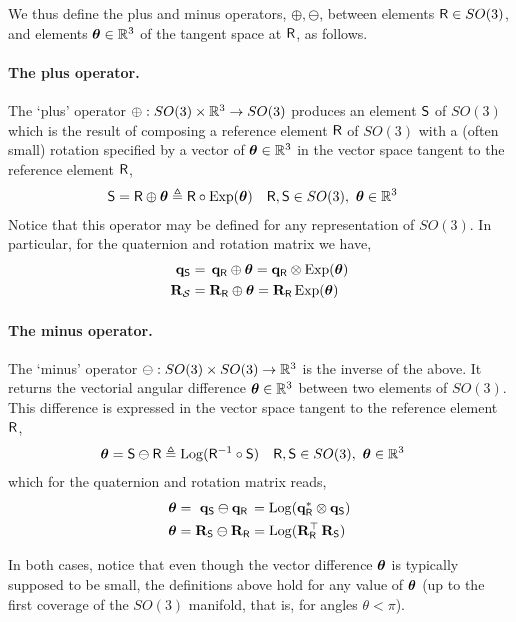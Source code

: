 We thus define the plus and minus operators, $\oplus,\ominus$, between elements $\mathsf R\in SO(3)$, and elements ${{\bm \theta}}\in{\mathbb R}^3$ of the tangent space at $\mathsf R$, as follows.

\paragraph{The plus operator.}
The `plus' operator $\oplus:SO(3)\times{\mathbb R}^3\to SO(3)$ produces an element $\mathsf S$ of $SO(3)$ which is the result of composing a reference element $\mathsf R$ of $SO(3)$ with a (often small) rotation specified by a vector of ${{\bm \theta}}\in{\mathbb R}^3$ in the vector space tangent to the reference element $\mathsf R$,
%
\begin{align}
\mathsf S = \mathsf R\oplus {{\bm \theta}} &\triangleq \mathsf R\circ\operatorname*{Exp}({{\bm \theta}}) && \mathsf R,\mathsf S\in SO(3),~ {{\bm \theta}}\in{\mathbb R}^3 
\end{align}
%
Notice that this operator may be defined for any representation of $SO(3)$. In particular, for the quaternion and rotation matrix we have,
%
\begin{align}
{\bf q}_\mathsf S &= \,{\bf q}_\mathsf R\oplus{{\bm \theta}} = {\bf q}_\mathsf R\otimes\operatorname*{Exp}({{\bm \theta}}) \\
{\bf R}_{\mathcal{S}} &= {\bf R}_\mathsf R\oplus {{\bm \theta}} = {\bf R}_\mathsf R\operatorname*{Exp}({{\bm \theta}}) 
\end{align}

\paragraph{The minus operator.}
The `minus' operator $\ominus:SO(3)\times SO(3)\to{\mathbb R}^3$ is the inverse of the above. It returns the vectorial angular difference ${{\bm \theta}}\in{\mathbb R}^3$ between two elements of $SO(3)$. This difference is expressed in the  vector space tangent to the reference element $\mathsf R$, 
%
\begin{align}
{{\bm \theta}}=\mathsf S\ominus \mathsf R
&\triangleq \operatorname*{Log}(\mathsf R^{-1} \circ \mathsf S)     && \mathsf R,\mathsf S\in SO(3),~ {{\bm \theta}}\in{\mathbb R}^3  
\end{align}
%
which for the quaternion and rotation matrix reads,
%
\begin{align}
{{\bm \theta}} &= \,\,{\bf q}_\mathsf S\ominus{\bf q}_\mathsf R\, = \operatorname*{Log}({\bf q}_\mathsf R^*\otimes{\bf q}_\mathsf S)                      \\
{{\bm \theta}} &= {\bf R}_\mathsf S\ominus{\bf R}_\mathsf R = \operatorname*{Log}({\bf R}_\mathsf R^{\top}\,{\bf R}_\mathsf S)                         
\end{align}

\bigskip
In both cases, notice that even though the vector difference ${\bm \theta}$ is typically supposed to be small, the definitions above hold for any value of ${\bm \theta}$ (up to the first coverage of the $SO(3)$ manifold, that is, for angles $\theta<\pi$).

